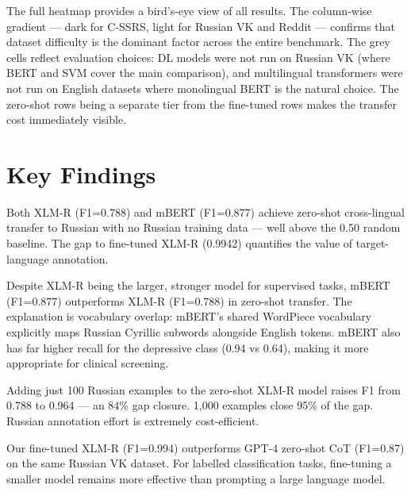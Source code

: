 \documentclass[12pt, a4paper, oneside]{report}
\begin{document}
The full heatmap provides a bird's-eye view of all results. The column-wise gradient — dark for C-SSRS, light for Russian VK and Reddit — confirms that dataset difficulty is the dominant factor across the entire benchmark. The grey cells reflect evaluation choices: DL models were not run on Russian VK (where BERT and SVM cover the main comparison), and multilingual transformers were not run on English datasets where monolingual BERT is the natural choice. The zero-shot rows being a separate tier from the fine-tuned rows makes the transfer cost immediately visible.

\section{Key Findings}

\begin{findingbox}[title={Finding 1 — Zero-shot transfer works but has a measurable cost}]
Both XLM-R (F1=0.788) and mBERT (F1=0.877) achieve zero-shot cross-lingual transfer to Russian with no Russian training data — well above the 0.50 random baseline. The gap to fine-tuned XLM-R (0.9942) quantifies the value of target-language annotation.
\end{findingbox}

\begin{findingbox}[title={Finding 2 — mBERT outperforms XLM-R in zero-shot transfer}]
Despite XLM-R being the larger, stronger model for supervised tasks, mBERT (F1=0.877) outperforms XLM-R (F1=0.788) in zero-shot transfer. The explanation is vocabulary overlap: mBERT's shared WordPiece vocabulary explicitly maps Russian Cyrillic subwords alongside English tokens. mBERT also has far higher recall for the depressive class (0.94 vs 0.64), making it more appropriate for clinical screening.
\end{findingbox}

\begin{findingbox}[title={Finding 3 — 100 examples close 84\% of the zero-shot gap}]
Adding just 100 Russian examples to the zero-shot XLM-R model raises F1 from 0.788 to 0.964 — an 84\% gap closure. 1,000 examples close 95\% of the gap. Russian annotation effort is extremely cost-efficient.
\end{findingbox}

\begin{findingbox}[title={Finding 4 — Fine-tuned XLM-R beats GPT-4 by 12 F1 points}]
Our fine-tuned XLM-R (F1=0.994) outperforms GPT-4 zero-shot CoT (F1=0.87) \citep{raihan2025} on the same Russian VK dataset. For labelled classification tasks, fine-tuning a smaller model remains more effective than prompting a large language model.
\end{findingbox}
\end{document}
